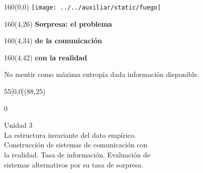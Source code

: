 \documentclass[shownotes,aspectratio=169]{beamer}
\begin{document}
\begin{frame}

\begin{textblock}{160}(0,0)
\texttt{[image: ../../auxiliar/static/fuego]}
\end{textblock}

\begin{textblock}{160}(4,26)
\LARGE \textcolor{black!5}{\fontsize{22}{0}\selectfont \textbf{Sorpresa: el problema}}
\end{textblock}
\begin{textblock}{160}(4,34)
\LARGE \textcolor{black!5}{\fontsize{22}{0}\selectfont \textbf{de la comunicación}}
\end{textblock}
\begin{textblock}{160}(4,42)
\LARGE \textcolor{black!5}{\fontsize{22}{0}\selectfont \textbf{con la realidad}}
\end{textblock}


No mentir como máxima entropía dada información disponible.
\begin{textblock}{55}[0,0](88,25)
\begin{turn}{0}
\parbox{7cm}{\sloppy\setlength\parfillskip{0pt}
\textcolor{black!0}{Unidad 3} \\
\small\textcolor{black!5}{\hspace{-0.3cm}La estructura invariante del dato empírico.} \\
\small\textcolor{black!5}{\hspace{-0.3cm}Construcción de sistemas de comunicación con}\\
\small\textcolor{black!5}{\hspace{-0.4cm}la realidad. Tasa de información. Evaluación de} \\
\small\textcolor{black!5}{\hspace{-0.6cm}sistemas alternativos por su tasa de sorpresa.} \\
}
\end{turn}
\end{textblock}

\end{frame}
\end{document}
